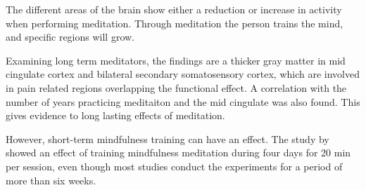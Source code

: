 The different areas of the brain show either a reduction or increase in activity when performing meditation. Through meditation the person trains the mind, and specific regions will grow. \cite{Zeidan2012}

Examining long term meditators, the findings are a thicker gray matter in mid cingulate cortex and bilateral secondary somatosensory cortex, which are involved in pain related regions overlapping the functional effect. A correlation with the number of years practicing meditaiton and the mid cingulate was also found. This gives evidence to long lasting effects of meditation. \cite{Zeidan2012}

However, short-term mindfulness training can have an effect. The study by \cite{Zeidan2012} showed an effect of training mindfulness meditation during four days for 20 min per session, even though most studies conduct the experiments for a period of more than six weeks. \cite{Zeidan2012}